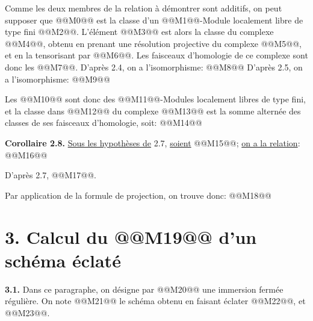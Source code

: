
Comme les deux membres de la relation à démontrer sont additifs, on peut supposer que @@M0@@ est la classe d'un @@M1@@-Module localement libre de type fini @@M2@@. L'élément @@M3@@ est alors la classe du complexe @@M4@@, obtenu en prenant une résolution projective du complexe @@M5@@, et en la tensorisant par @@M6@@. Les faisceaux d'homologie de ce complexe sont donc les @@M7@@. D'après 2.4, on a l'isomorphisme:
@@M8@@
D'après 2.5, on a l'isomorphisme:
@@M9@@

Les @@M10@@ sont donc des @@M11@@-Modules localement libres de type fini, et la classe dans @@M12@@ du complexe @@M13@@ est la somme alternée des classes de ses faisceaux d'homologie, soit:
@@M14@@

\textbf{Corollaire 2.8.} \uline{Sous les hypothèses de} 2.7, \uline{soient} @@M15@@; \uline{on a la relation}:
@@M16@@

D'après 2.7, @@M17@@.

Par application de la formule de projection, on trouve donc:
@@M18@@

\section*{3. Calcul du \texorpdfstring{@@M19@@}{K} d'un schéma éclaté}

\textbf{3.1.} Dans ce paragraphe, on désigne par @@M20@@ une immersion fermée régulière. On note @@M21@@ le schéma obtenu en faisant éclater @@M22@@, et @@M23@@.
